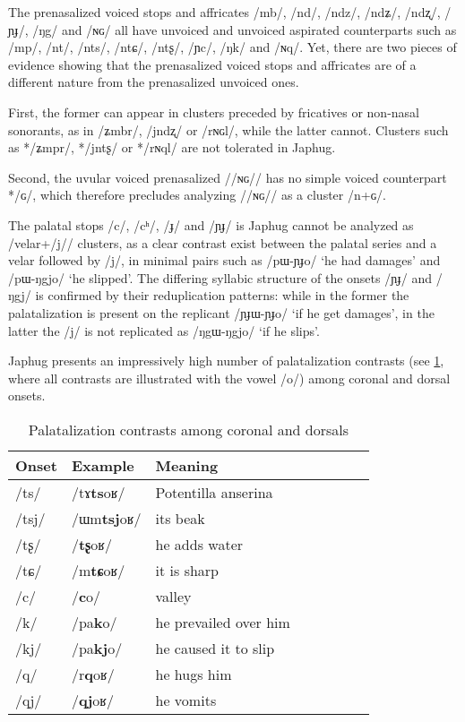 \documentclass[oldfontcommands,oneside,a4paper,11pt]{article}
\newcommand{\ipa}[1]{/#1/} %
\begin{document}
      
      The prenasalized voiced stops and affricates \ipa{mb}, \ipa{nd}, \ipa{ndz}, \ipa{ndʑ}, \ipa{ndʐ}, \ipa{ɲɟ}, \ipa{ŋg} and \ipa{ɴɢ} all have unvoiced and unvoiced aspirated counterparts such as \ipa{mp}, \ipa{nt}, \ipa{nts}, \ipa{ntɕ}, \ipa{ntʂ}, \ipa{ɲc}, \ipa{ŋk} and \ipa{ɴq}. Yet, there are two pieces of evidence showing that the prenasalized voiced stops and affricates are of a different nature from the prenasalized unvoiced ones. 
      
      First, the former can appear in clusters preceded by fricatives or non-nasal sonorants, as in \ipa{ʑmbr}, \ipa{jndʐ} or \ipa{rɴɢl}, while the latter cannot. Clusters such as *\ipa{ʑmpr}, *\ipa{jntʂ} or *\ipa{rɴql} are not tolerated in Japhug.
      
Second, the uvular voiced prenasalized /\ipa{ɴɢ}/ has no simple voiced counterpart *\ipa{ɢ}, which therefore precludes analyzing /\ipa{ɴɢ}/ as a cluster \ipa{n+ɢ}.
      


The palatal stops \ipa{c}, \ipa{cʰ}, \ipa{ɟ} and \ipa{ɲɟ} is Japhug cannot be analyzed as /velar+\ipa{j}/ clusters, as a clear contrast exist between the palatal series and a velar followed by \ipa{j}, in minimal pairs such as   \ipa{pɯ-ɲɟo} `he had damages' and \ipa{pɯ-ŋgjo} `he slipped'. The differing syllabic structure of the onsets \ipa{ɲɟ} and \ipa{ŋgj} is confirmed by their reduplication patterns: while in the former the palatalization is present on the replicant \ipa{ɲɟɯ-ɲɟo} `if he get damages', in the latter the \ipa{j} is not replicated as  \ipa{ŋgɯ-ŋgjo} `if he slips'.
      
      Japhug   presents an impressively high number of palatalization contrasts (see \ref{tab:coronal.dorsal}, where all contrasts are illustrated with the vowel \ipa{o}) among coronal and dorsal onsets. 
      
      		   \begin{table}
 \caption{Palatalization contrasts among coronal and dorsals } \label{tab:coronal.dorsal}  \centering
\begin{tabular}{llllllll}
\toprule		
Onset & Example & Meaning \\
\midrule
      \ipa{ts} &      \ipa{tɤ\textbf{ts}oʁ}  & Potentilla anserina \\
      \ipa{tsj} &     \ipa{ɯm\textbf{tsj}oʁ}  & its beak \\
      \ipa{tʂ} &      \ipa{\textbf{tʂ}oʁ}  & he adds water \\
      \ipa{tɕ} &      \ipa{m\textbf{tɕ}oʁ}  &it is sharp\\
      \ipa{c} &      \ipa{\textbf{c}o}  & valley \\
      \ipa{k} &      \ipa{pa\textbf{k}o}  & he prevailed over him \\
      \ipa{kj} &      \ipa{pa\textbf{kj}o}  & he caused it to slip \\
      \ipa{q} &      \ipa{r\textbf{q}oʁ}  &he hugs him \\
      \ipa{qj} &      \ipa{\textbf{qj}oʁ}  & he vomits \\
      \bottomrule
\end{tabular}
\end{table}
 
\end{document}
